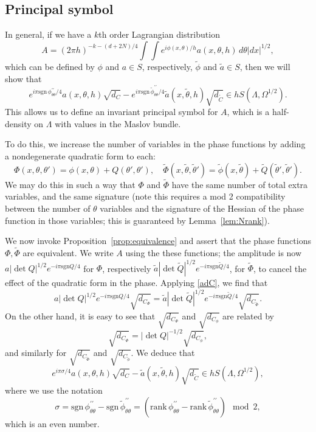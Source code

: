 \documentclass[10pt, a4paper, twoside]{amsart}
\numberwithin{equation}{section}
\theoremstyle{remark}
\begin{document}
\begin{appendix}
	\subsection{Principal symbol}
	In general, if we have a $k$th order Lagrangian distribution
	$$
	 A = (2\pi h)^{-k- (d + 2N)/4} \int\int e^{i \phi(x, \theta) / h} a(x, \theta, h) \, d\theta |dx|^{1/2},
	$$ 
	which can be defined by $\phi$ and $a \in S$, respectively, $\tilde{\phi}$ and $\tilde{a} \in S$, then we will show that 
	\begin{equation}
	e^{ i \pi \text{sgn}\, \phi^{\prime\prime}_{\theta\theta}/4}a(x, \theta, h) \sqrt{d_C}  - e^{ i \pi \text{sgn}\, \tilde{\phi}^{\prime\prime}_{\theta\theta}/4} \tilde{a}(x, \tilde{\theta}, h) \sqrt{d_{\tilde{C}}} \in h S(\Lambda, \Omega^{1/2}).
	\end{equation}
	This allows us to define an invariant principal symbol for $A$, which is a half-density on $\Lambda$ with values in the Maslov bundle. 
	
	To do this, we increase the number of variables in the phase functions by adding a nondegenerate quadratic form to each:
	$$
	\Phi(x, \theta, \theta') = \phi(x, \theta) + Q(\theta', \theta'), \quad \tilde\Phi(x, \tilde\theta, \tilde\theta') = \tilde\phi(x, \tilde\theta) + \tilde Q(\tilde\theta', \tilde\theta').
	$$
	We may do this in such a way that $\Phi$ and $\tilde\Phi$ have the same number of total extra variables, and the same signature (note this requires a mod 2 compatibility between the number of $\theta$ variables and the signature of the Hessian of the phase function in those variables; this is guaranteed by Lemma~\ref{lem:Nrank}). 
	
	We now invoke Proposition~\ref{prop:equivalence} and assert that the phase functions $\Phi, \tilde\Phi$ are equivalent. We write $A$ using the these functions; the amplitude  is now $a |\det Q|^{1/2} e^{-i\pi {\mathrm{sgn}} Q/4}$ for $\Phi$, respectively $\tilde a |\det \tilde Q|^{1/2} e^{-i\pi {\mathrm{sgn}} \tilde Q/4}$, for $\tilde \Phi$, to cancel the effect of the quadratic form in the phase. 
	Applying \eqref{adC}, we find that 
	$$
	a |\det Q|^{1/2} e^{-i\pi {\mathrm{sgn}} Q/4} \sqrt{d_{C_{\Phi}}} = \tilde a |\det \tilde Q|^{1/2} e^{-i\pi {\mathrm{sgn}} \tilde Q/4} \sqrt{d_{C_{\tilde \Phi}}}.
	$$
	On the other hand, it is easy to see that $\sqrt{d_{C_{\Phi}}}$ and $\sqrt{d_{C_{\phi}}}$ are related by 
	$$
	\sqrt{d_{C_{\Phi}}} = |\det Q|^{-1/2} \sqrt{d_{C_{\phi}}},
	$$
	and similarly for $\sqrt{d_{C_{\tilde\Phi}}}$ and $\sqrt{d_{C_{\tilde\phi}}}$. We deduce that 
	$$ e^{ i \pi \sigma/4} a(x, \theta, h) \sqrt{d_C} -   \tilde{a}(x, \tilde{\theta}, h) \sqrt{d_{\tilde{C}}} \in h S(\Lambda, \Omega^{1/2}),$$
	where we use the notation 
	$$\sigma = \text{sgn}\, \phi^{\prime\prime}_{\theta\theta} - \text{sgn}\, \tilde{\phi}^{\prime\prime}_{\theta\theta} = (\text{rank}\, \phi^{\prime\prime}_{\theta\theta} - \text{rank}\, \tilde{\phi}^{\prime\prime}_{\theta\theta})\mod 2,$$ which is an even number. 
	

\end{appendix}
\end{document}
